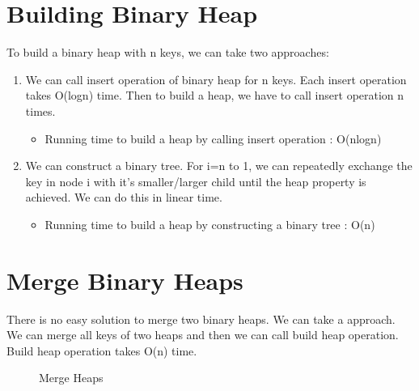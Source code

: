 \documentclass[14pt,a4paper]{report}
\begin{document}
\section{Building Binary Heap}
To build a binary heap with n keys, we can take two approaches:
\begin{enumerate}
    \item We can call insert operation of binary heap for n keys. Each insert operation takes O(logn) time. Then to build a heap, we have to call insert operation n times.
    \begin{itemize}
        \item Running time to build a heap by calling insert operation : O(nlogn)
    \end{itemize}
    
    \item We can construct a binary tree. For i=n to 1, we can repeatedly exchange the key in node i with it's smaller/larger child until the heap property is achieved. We can do this in linear time. 
    \begin{itemize}
        \item Running time to build a heap by constructing a binary tree : O(n)
    \end{itemize}
\end{enumerate}
    
\section{Merge Binary Heaps}
There is no easy solution to merge two binary heaps. We can take a approach. We can merge all keys of two heaps and then we can call build heap operation. Build heap operation takes O(n) time. 

\bigskip

\begin{figure}[H]
    \centering

    \caption{Merge Heaps}
    \label{fig:my_label}
\end{figure}
\end{document}
